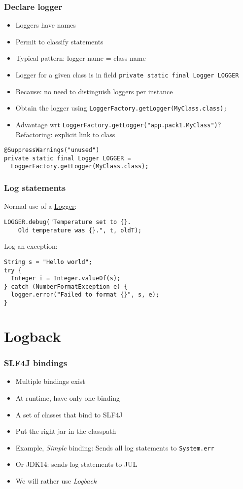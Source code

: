 \documentclass[french, english]{beamer}
\begin{document}
\begin{frame}[fragile]
	\frametitle{Declare logger}
	\begin{itemize}
		\item Loggers have names
		\item Permit to classify statements
		\item Typical pattern: logger name = class name
		\item Logger for a given class is in field \texttt{private static final Logger LOGGER}
		\item Because: no need to distinguish loggers per instance
		\item Obtain the logger using \texttt{LoggerFactory.getLogger(MyClass.class);}
		\item Advantage wrt \texttt{LoggerFactory.getLogger("app.pack1.MyClass")}? \pause Refactoring: explicit link to class \pause
	\end{itemize}
	\begin{lstlisting}
@SuppressWarnings("unused")
private static final Logger LOGGER = 
  LoggerFactory.getLogger(MyClass.class);
	\end{lstlisting}
\end{frame}

\begin{frame}[fragile]
	\frametitle{Log statements}
	Normal use of a \href{https://www.slf4j.org/api/org/slf4j/Logger.html}{Logger}:
	\begin{lstlisting}
LOGGER.debug("Temperature set to {}. 
    Old temperature was {}.", t, oldT);
	\end{lstlisting}
	\vspace{1em}
	Log an exception:
	\begin{lstlisting}
String s = "Hello world";
try {
  Integer i = Integer.valueOf(s);
} catch (NumberFormatException e) {
  logger.error("Failed to format {}", s, e);
}
	\end{lstlisting}
\end{frame}

\section{Logback}
\begin{frame}
	\frametitle{SLF4J bindings}
	\begin{itemize}
		\item Multiple bindings exist
		\item At runtime, have only one binding
		\item A set of classes that bind to SLF4J
		\item Put the right jar in the classpath
		\item Example, \emph{Simple} binding: Sends all log statements to \texttt{System.err}
		\item Or JDK14: sends log statements to JUL
		\item We will rather use \emph{Logback}
	\end{itemize}
\end{frame}
\end{document}
